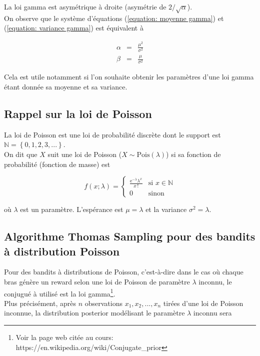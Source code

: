 \documentclass[letterpaper,11pt]{article}
\renewcommand{\exp}[1]{\mathrm{e}^{#1}}
\begin{document}
La loi gamma est asymétrique à droite (asymétrie de $2/\sqrt{\alpha}$).\\
On observe que le système d'équations (\ref{equation: moyenne gamma}) et (\ref{equation: variance gamma}) est équivalent à

\begin{eqnarray}
\alpha   &=& \frac{\mu^2}{\sigma^2} \label{equation: alpha gamma}\\
\beta &=& \frac{\mu}{\sigma^2} \label{equation: beta gamma}
\end{eqnarray}

Cela est utile notamment si l'on souhaite obtenir les paramètres d'une loi gamma étant donnée sa moyenne et sa variance.

\subsection{Rappel sur la loi de Poisson}

La loi de Poisson est une loi de probabilité discrète dont le support est $\mathbb{N}=\left\{0,1,2,3,...\right\}.$\\
On dit que $X$ suit une loi de Poisson ($X\sim\mathrm{Pois}(\lambda)$) si sa fonction de probabilité (fonction de masse) est

\begin{equation*}
f(x; \lambda) = 
\left\{
\begin{array}{cl}
\frac{\exp{-\lambda} \lambda^x}{x\,!} & \text{si } x\in\mathbb{N}\\[0.4cm]
0 & \text{sinon}
\end{array}
\right.
\end{equation*}

où $\lambda$ est un paramètre. L'espérance est $\mu=\lambda$ et la variance $\sigma^2=\lambda.$

\subsection{Algorithme Thomas Sampling pour des bandits à distribution Poisson }

Pour des bandits à distributions de Poisson, c'est-à-dire dans le cas où chaque bras génère un reward selon une loi de Poisson de paramètre $\lambda$ inconnu, le conjugué à utilisé est la loi gamma\footnote{Voir la page web citée au cours: https://en.wikipedia.org/wiki/Conjugate\_prior}.\\

Plus précisément, après $n$ observations $x_1,x_2,...,x_n$ tirées d'une loi de Poisson inconnue, la distribution posterior modélisant le paramètre $\lambda$ inconnu sera
\end{document}

